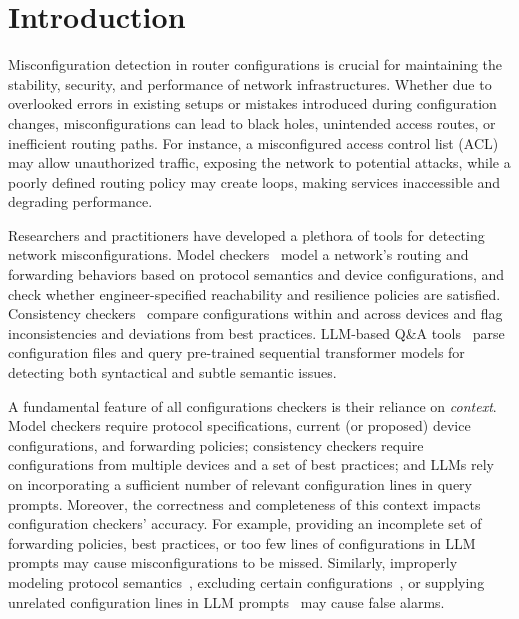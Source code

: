 
\section{Introduction}
\label{sec:intro}

Misconfiguration detection in router configurations is crucial for maintaining the stability, security, and performance of network infrastructures. Whether due to overlooked errors in existing setups or mistakes introduced during configuration changes, misconfigurations can lead to black holes, unintended access routes, or inefficient routing paths. %
For instance, a misconfigured access control list (ACL) may allow unauthorized traffic, exposing the network to potential attacks, while a poorly defined routing policy may create loops, making services inaccessible and degrading performance.

Researchers and practitioners have developed a plethora of tools for detecting network misconfigurations. Model checkers~\cite{fogel2015general, beckett2017general, abhashkumar2020tiramisu, prabhu2020plankton, zhang2022sre, steffen2020netdice, ye2020hoyan, ritchey2000using,al2011configchecker, jeffrey2009model} model a network's routing and forwarding behaviors based on protocol semantics and device configurations, and check whether engineer-specified reachability and resilience policies are satisfied. Consistency checkers~\cite{kakarla2024diffy, kakarla2020finding, le2006minerals, feamster2005detecting, tang2021campion,le2008detecting,le2006characterization} compare configurations within and across devices and flag inconsistencies and deviations from best practices. LLM-based Q\&A tools~\cite{bogdanov2024leveraging,chen2024automatic,wang2024identifying,liu2024large, wang2024netconfeval, lian2023configuration} parse configuration files and query pre-trained sequential transformer models for detecting both syntactical and subtle semantic issues.

A fundamental feature of all configurations checkers is their reliance on {\em context}. Model checkers require protocol specifications, current (or proposed) device configurations, and forwarding policies; consistency checkers require configurations from multiple devices and a set of best practices; and LLMs rely on incorporating a sufficient number of relevant configuration lines in query prompts. Moreover, the correctness and completeness of this context impacts configuration checkers' accuracy. For example, providing an incomplete set of forwarding policies, best practices, or too few lines of configurations in LLM prompts may cause misconfigurations to be missed. Similarly, improperly modeling protocol semantics~\cite{birkner2021metha, ye2020hoyan}, excluding certain configurations~\cite{xu2023netcov}, or supplying unrelated configuration lines in LLM prompts~\cite{liskavets2024prompt,tian2024examining,khurana2024and, shvartzshnaider2024llm} may cause false alarms.

